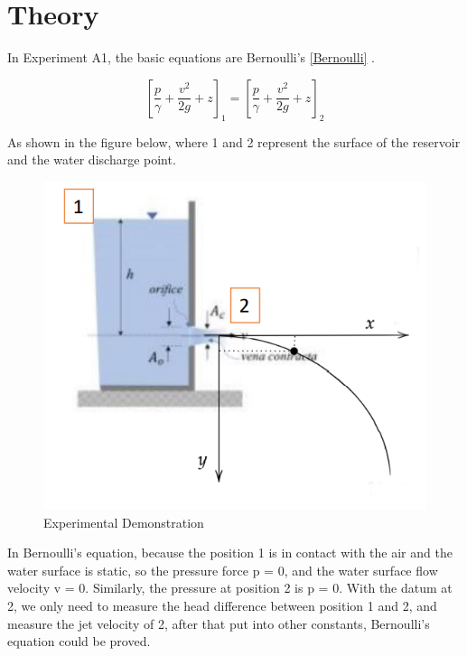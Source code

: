 \section{Theory}
In Experiment A1, the basic equations are Bernoulli's \eqref{Bernoulli} .

\begin{equation}
\label{Bernoulli}
\left[ \frac{p}{\gamma}+\frac{v^2}{2g}+z \right]_1 = 
\left[ \frac{p}{\gamma}+\frac{v^2}{2g}+z \right]_2 
\end{equation}

As shown in the figure below, where 1 and 2 represent the surface of 
the reservoir and the water discharge point.

\begin{figure}[htb] %
    \centering
    \includegraphics[scale=0.45]{Theory/figures/figure1.png}
    \caption{Experimental Demonstration}
    \label{fig:demo}
\end{figure}

In Bernoulli's equation, because the position 1 is in contact with the air and the water surface is static, 
so the pressure force p = 0, and the water surface flow velocity v = 0. 
Similarly, the pressure at position 2 is p = 0. 
With the datum at 2, we only need to measure the head difference between position 1 and 2, 
and measure the jet velocity of 2, after that put into other constants, 
Bernoulli's equation could be proved.

